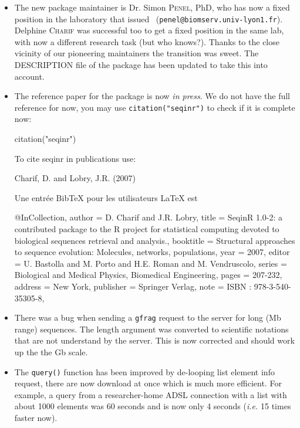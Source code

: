 \documentclass{article}
\begin{document}
\begin{itemize}
\item The new package maintainer is Dr. Simon \textsc{Penel}, PhD, who has now a fixed position in the laboratory that issued \seqinr~(\texttt{penel@biomserv.univ-lyon1.fr}). Delphine \textsc{Charif} was
successful too to get a fixed position in the same lab, with now a different research task (but who knows?).
Thanks to the close vicinity of our pioneering maintainers the transition was sweet. The DESCRIPTION
file of the \seqinr{} package has been updated to take this into account.

\item The reference paper for the package is now \textit{in press}. We do not have the full
reference for now, you may use \texttt{citation("seqinr")} to check if it is complete now:
\begin{Schunk}
\begin{Sinput}
 citation("seqinr")
\end{Sinput}
\begin{Soutput}
To cite seqinr in publications use:

  Charif, D. and Lobry, J.R. (2007)

Une entrée BibTeX pour les utilisateurs LaTeX est

  @InCollection{,
    author = {D. Charif and J.R. Lobry},
    title = {Seqin{R} 1.0-2: a contributed package to the {R} project for statistical computing devoted to biological sequences retrieval and analysis.},
    booktitle = {Structural approaches to sequence evolution: Molecules, networks, populations},
    year = {2007},
    editor = {U. Bastolla and M. Porto and H.E. Roman and M. Vendruscolo},
    series = {Biological and Medical Physics, Biomedical Engineering},
    pages = {207-232},
    address = {New York},
    publisher = {Springer Verlag},
    note = {{ISBN :} 978-3-540-35305-8},
  }
\end{Soutput}
\end{Schunk}

\item There was a bug when sending a \texttt{gfrag} request to the server for long (Mb range) 
sequences. The length argument was converted to scientific notations that are not understand by the
server. This is now corrected and should work up the the Gb scale.

\item The \texttt{query()} function has been improved by de-looping list element info request,
there are now download at once which is much more efficient. For example, a query from a
researcher-home ADSL connection with a list with about 1000 elements was 60 seconds and
is now only 4 seconds (\textit{i.e.} 15 times faster now).


\end{itemize}
\end{document}
